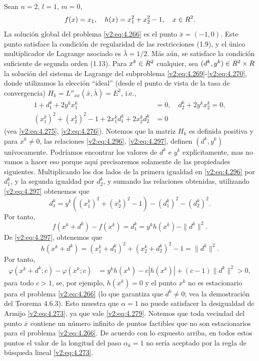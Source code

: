 \begin{example}\label{v2:exa:4.6.1}
    Sean $n = 2$, $l = 1$, $m = 0$,
    \[
        f(x) = x_1, \quad h(x) = x_1^2 + x_2^2 - 1, \quad x \in R^2.
    \]
    La solución global del problema \eqref{v2:eq:4.266} es el punto $\bar{x} = (-1, 0)$. Este punto satisface la condición de regularidad de las restricciones (1.9), y el único multiplicador de Lagrange asociado es $\bar{\lambda} = 1/2$. Más aún, se satisface la condición suficiente de segunda orden (1.13).
    Para $x^k \in R^2$ cualquier, sea $(d^k, y^k) \in R^2 \times R$ la solución del sistema de Lagrange del subproblema \eqref{v2:eq:4.269}-\eqref{v2:eq:4.270}, donde utilizamos la elección ``ideal'' (desde el punto de vista de la tasa de convergencia) $H_k = L''_{xx}(\bar{x}, \bar{\lambda}) = E^2$, i.e.,
    \begin{align}
        1 + d_1^k + 2y^k x_1^k &= 0, \quad d_2^k + 2y^k x_2^k = 0, \label{v2:eq:4.296} \\
        (x_1^k)^2 + (x_2^k)^2 - 1 + 2x_1^k d_1^k + 2x_2^k d_2^k &= 0 \label{v2:eq:4.297}
    \end{align}
    (vea \eqref{v2:eq:4.275}, \eqref{v2:eq:4.276}). Notemos que la matriz $H_k$ es definida positiva y para $x^k \neq 0$, las relaciones \eqref{v2:eq:4.296}, \eqref{v2:eq:4.297}, definen $(d^k, y^k)$ unívocamente. Podríamos encontrar los valores de $d^k$ e $y^k$ explícitamente, mas no vamos a hacer eso porque aquí precisaremos solamente de las propiedades siguientes.
    Multiplicando los dos lados de la primera igualdad en \eqref{v2:eq:4.296} por $d_1^k$, y la segunda igualdad por $d_2^k$, y sumando las relaciones obtenidas, utilizando \eqref{v2:eq:4.297} obtenemos que
    \[
        d_1^k = y^k((x_1^k)^2 + (x_2^k)^2 - 1) - (d_1^k)^2 - (d_2^k)^2.
    \]
    Por tanto,
    \[
        f(x^k + d^k) - f(x^k) = d_1^k = y^k h(x^k) - \|d^k\|^2.
    \]
    De \eqref{v2:eq:4.297}, obtenemos que
    \[
        h(x^k + d^k) = (x_1^k + d_1^k)^2 + (x_2^k + d_2^k)^2 - 1 = \|d^k\|^2.
    \]
    Por tanto,
    \begin{align}
        \varphi(x^k + d^k; c) - \varphi(x^k; c) &= y^k h(x^k) - c|h(x^k)| + (c - 1)\|d^k\|^2 > 0,
    \end{align}
    para todo $c > 1$, se, por ejemplo, $h(x^k) = 0$ y el punto $x^k$ no es estacionario para el problema \eqref{v2:eq:4.266} (lo que garantiza que $d^k \neq 0$; vea la demostración del Teorema 4.6.3). Esto muestra que $\alpha = 1$ no puede satisfacer la desigualdad de Armijo \eqref{v2:eq:4.273}, ya que vale \eqref{v2:eq:4.279}.
    Notemos que toda vecindad del punto $\bar{x}$ contiene un número infinito de puntos factibles que no son estacionarios para el problema \eqref{v2:eq:4.266}. De acuerdo con lo expuesto arriba, en todos estos puntos el valor de la longitud del paso $\alpha_k = 1$ no sería aceptado por la regla de búsqueda lineal \eqref{v2:eq:4.273}.
\end{example}

